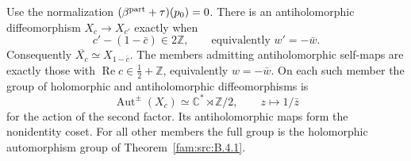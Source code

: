 \begin{proposition}\hypertarget{tag-01QG}{}\label{fam:src:B.4.2}\label{fam:st:B.4.2}

Use the normalization $(\beta^{\rm part}+\tau)(p_0)=0$. There is an antiholomorphic diffeomorphism $X_c\to X_{c'}$ exactly when
\[
 c'-(1-\bar c)\in2\mathbb Z,
 \qquad\text{equivalently }w'=-\bar w.
\]
Consequently $\overline{X_c}\simeq X_{1-\bar c}$. The members admitting antiholomorphic self-maps are exactly those with $\operatorname{Re}c\in\tfrac12+\mathbb Z$, equivalently $w=-\bar w$. On each such member the group of holomorphic and antiholomorphic diffeomorphisms is
\[
 \operatorname{Aut}^{\pm}(X_c)\simeq\mathbb C^*\rtimes\mathbb Z/2,
 \qquad z\longmapsto1/\bar z
\]
for the action of the second factor. Its antiholomorphic maps form the nonidentity coset. For all other members the full group is the holomorphic automorphism group of Theorem~\ref{fam:src:B.4.1}.
\end{proposition}


